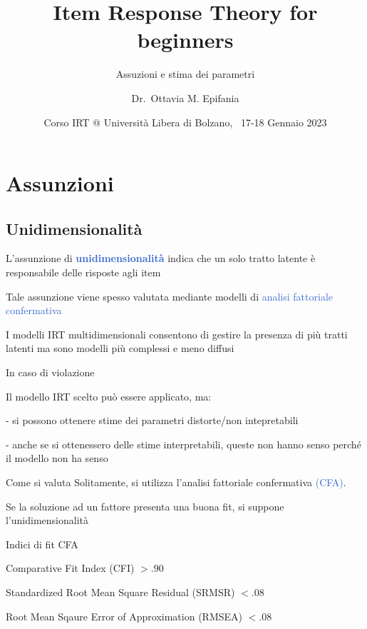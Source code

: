 \documentclass[
  ignorenonframetext,
]{beamer}
\title{Item Response Theory for beginners}
\subtitle{Assuzioni e stima dei parametri}
\author{Dr.~Ottavia M. Epifania}
\date{Corso IRT @ Università Libera di Bolzano, ~17-18 Gennaio 2023}
\institute{Bressanone}
\begin{document}
\frame{\titlepage}

\begin{frame}[allowframebreaks]
  \tableofcontents[hideallsubsections]
\end{frame}
\hypertarget{assunzioni}{%
\section{Assunzioni}\label{assunzioni}}

\hypertarget{unidimensionalituxe0}{%
\subsection{Unidimensionalità}\label{unidimensionalituxe0}}

\begin{frame}{}
\protect\hypertarget{section}{}
L'assunzione di \textcolor{highlight}{\textbf{unidimensionalità}} indica
che un solo tratto latente è responsabile delle risposte agli item

Tale assunzione viene spesso valutata mediante modelli di
\textcolor{highlight}{analisi fattoriale confermativa}

I modelli IRT multidimensionali consentono di gestire la presenza di più
tratti latenti ma sono modelli più complessi e meno diffusi

\begin{block}{In caso di violazione}

\vspace{3mm}
Il modello IRT scelto può essere applicato, ma: 

- si possono ottenere stime dei parametri distorte/non intepretabili

- anche se si ottenessero delle stime interpretabili, queste non hanno senso perché il modello non ha senso

\end{block}
\end{frame}

\begin{frame}{Come si valuta}
\protect\hypertarget{come-si-valuta}{}
Solitamente, si utilizza l'analisi fattoriale confermativa
\textcolor{highlight}{(CFA)}.

Se la soluzione ad un fattore presenta una buona fit, si suppone
l'unidimensionalità

\begin{block}{Indici di fit CFA}

\vspace{3mm}
Comparative Fit Index (CFI) $> .90$


Standardized Root Mean Square Residual (SRMSR) $<.08$

Root Mean Sqaure Error of Approximation (RMSEA) $<. 08$

\end{block}
\end{frame}
\end{document}
